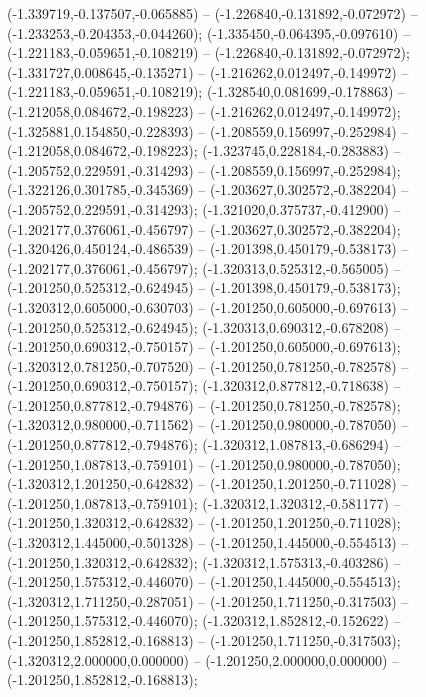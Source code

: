  (-1.339719,-0.137507,-0.065885) -- (-1.226840,-0.131892,-0.072972) -- (-1.233253,-0.204353,-0.044260);
 (-1.335450,-0.064395,-0.097610) -- (-1.221183,-0.059651,-0.108219) -- (-1.226840,-0.131892,-0.072972);
 (-1.331727,0.008645,-0.135271) -- (-1.216262,0.012497,-0.149972) -- (-1.221183,-0.059651,-0.108219);
 (-1.328540,0.081699,-0.178863) -- (-1.212058,0.084672,-0.198223) -- (-1.216262,0.012497,-0.149972);
 (-1.325881,0.154850,-0.228393) -- (-1.208559,0.156997,-0.252984) -- (-1.212058,0.084672,-0.198223);
 (-1.323745,0.228184,-0.283883) -- (-1.205752,0.229591,-0.314293) -- (-1.208559,0.156997,-0.252984);
 (-1.322126,0.301785,-0.345369) -- (-1.203627,0.302572,-0.382204) -- (-1.205752,0.229591,-0.314293);
 (-1.321020,0.375737,-0.412900) -- (-1.202177,0.376061,-0.456797) -- (-1.203627,0.302572,-0.382204);
 (-1.320426,0.450124,-0.486539) -- (-1.201398,0.450179,-0.538173) -- (-1.202177,0.376061,-0.456797);
 (-1.320313,0.525312,-0.565005) -- (-1.201250,0.525312,-0.624945) -- (-1.201398,0.450179,-0.538173);
 (-1.320312,0.605000,-0.630703) -- (-1.201250,0.605000,-0.697613) -- (-1.201250,0.525312,-0.624945);
 (-1.320313,0.690312,-0.678208) -- (-1.201250,0.690312,-0.750157) -- (-1.201250,0.605000,-0.697613);
 (-1.320312,0.781250,-0.707520) -- (-1.201250,0.781250,-0.782578) -- (-1.201250,0.690312,-0.750157);
 (-1.320312,0.877812,-0.718638) -- (-1.201250,0.877812,-0.794876) -- (-1.201250,0.781250,-0.782578);
 (-1.320312,0.980000,-0.711562) -- (-1.201250,0.980000,-0.787050) -- (-1.201250,0.877812,-0.794876);
 (-1.320312,1.087813,-0.686294) -- (-1.201250,1.087813,-0.759101) -- (-1.201250,0.980000,-0.787050);
 (-1.320312,1.201250,-0.642832) -- (-1.201250,1.201250,-0.711028) -- (-1.201250,1.087813,-0.759101);
 (-1.320312,1.320312,-0.581177) -- (-1.201250,1.320312,-0.642832) -- (-1.201250,1.201250,-0.711028);
 (-1.320312,1.445000,-0.501328) -- (-1.201250,1.445000,-0.554513) -- (-1.201250,1.320312,-0.642832);
 (-1.320312,1.575313,-0.403286) -- (-1.201250,1.575312,-0.446070) -- (-1.201250,1.445000,-0.554513);
 (-1.320312,1.711250,-0.287051) -- (-1.201250,1.711250,-0.317503) -- (-1.201250,1.575312,-0.446070);
 (-1.320312,1.852812,-0.152622) -- (-1.201250,1.852812,-0.168813) -- (-1.201250,1.711250,-0.317503);
 (-1.320312,2.000000,0.000000) -- (-1.201250,2.000000,0.000000) -- (-1.201250,1.852812,-0.168813);
